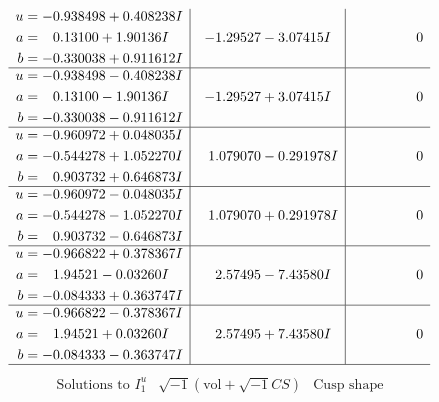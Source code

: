 \documentclass[1p]{elsarticle_modified}
\theoremstyle{definition}
\newcommand{\I}{\sqrt{-1}}
\begin{document}
$$\begin{array}{c|c|c}
\begin{aligned}
u &= -0.938498 + 0.408238 I \\
a &= \phantom{-}0.13100 + 1.90136 I \\
b &= -0.330038 + 0.911612 I\end{aligned}
 & -1.29527 - 3.07415 I & \phantom{-0.000000 } 0 \\ \hline\begin{aligned}
u &= -0.938498 - 0.408238 I \\
a &= \phantom{-}0.13100 - 1.90136 I \\
b &= -0.330038 - 0.911612 I\end{aligned}
 & -1.29527 + 3.07415 I & \phantom{-0.000000 } 0 \\ \hline\begin{aligned}
u &= -0.960972 + 0.048035 I \\
a &= -0.544278 + 1.052270 I \\
b &= \phantom{-}0.903732 + 0.646873 I\end{aligned}
 & \phantom{-}1.079070 - 0.291978 I & \phantom{-0.000000 } 0 \\ \hline\begin{aligned}
u &= -0.960972 - 0.048035 I \\
a &= -0.544278 - 1.052270 I \\
b &= \phantom{-}0.903732 - 0.646873 I\end{aligned}
 & \phantom{-}1.079070 + 0.291978 I & \phantom{-0.000000 } 0 \\ \hline\begin{aligned}
u &= -0.966822 + 0.378367 I \\
a &= \phantom{-}1.94521 - 0.03260 I \\
b &= -0.084333 + 0.363747 I\end{aligned}
 & \phantom{-}2.57495 - 7.43580 I & \phantom{-0.000000 } 0 \\ \hline\begin{aligned}
u &= -0.966822 - 0.378367 I \\
a &= \phantom{-}1.94521 + 0.03260 I \\
b &= -0.084333 - 0.363747 I\end{aligned}
 & \phantom{-}2.57495 + 7.43580 I & \phantom{-0.000000 } 0\\
 \hline 
 \end{array}$$\newpage$$\begin{array}{c|c|c}  
\text{Solutions to }I^u_{1}& \I (\text{vol} + \sqrt{-1}CS) & \text{Cusp shape}\\
 \hline 
\begin{aligned}

\end{aligned}
\end{array}$$
\end{document}
